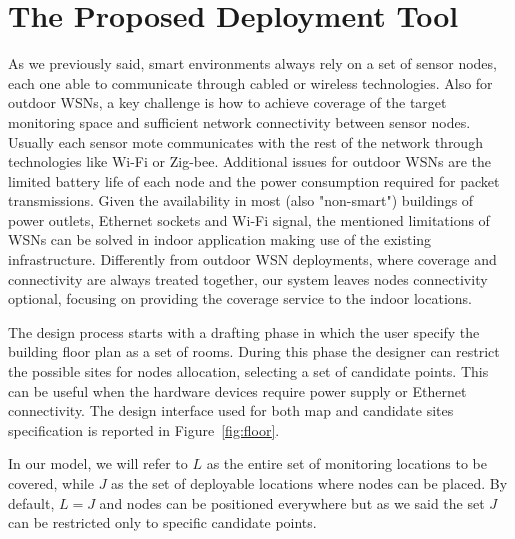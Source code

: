 \section{The Proposed Deployment Tool}\label{sec:plan_tool}
As we previously said, smart environments always rely on a set of sensor nodes, each one able to communicate through cabled or wireless technologies. Also for outdoor WSNs, a key challenge is how to achieve coverage of the target monitoring space and sufficient network connectivity between sensor nodes. Usually each sensor mote communicates with the rest of the network through technologies like Wi-Fi or Zig-bee. Additional issues for outdoor WSNs are the limited battery life of each node and the power consumption required for packet transmissions. Given the availability in most (also "non-smart") buildings of power outlets, Ethernet sockets and Wi-Fi signal, the mentioned limitations of WSNs can be solved in indoor application making use of the existing infrastructure. Differently from outdoor WSN deployments, where coverage and connectivity are always treated together, our system leaves nodes connectivity optional, focusing on providing the coverage service to the indoor locations.

The design process starts with a drafting phase in which the user specify the building floor plan as a set of rooms. During this phase the designer can restrict the possible sites for nodes allocation, selecting a set of candidate points. This can be useful when the hardware devices require power supply or Ethernet connectivity. The design interface used for both map and candidate sites specification is reported in Figure~\ref{fig:floor}.

In our model, we will refer to \(L\) as the entire set of monitoring locations to be covered, while \(J\) as the set of deployable locations where nodes can be placed. By default, \(L = J\) and nodes can be positioned everywhere but as we said the set \(J\) can be restricted only to specific candidate points.

